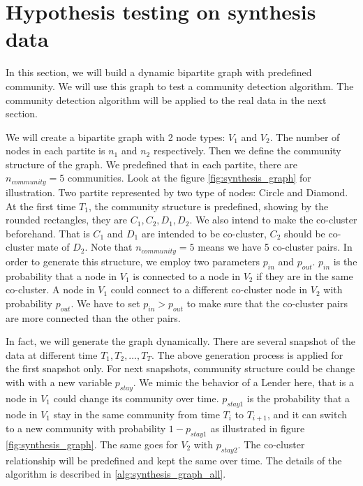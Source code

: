 
\section{Hypothesis testing on synthesis data}

In this section, we will build a dynamic bipartite graph with predefined community.
We will use this graph to test a community detection algorithm.
The community detection algorithm will be applied to the real data in the next section.

We will create a bipartite graph with 2 node types: $V_1$ and $V_2$.
The number of nodes in each partite is $n_1$ and $n_2$ respectively.
Then we define the community structure of the graph.
We predefined that in each partite, there are $n_{community} = 5$ communities.
Look at the figure \ref{fig:synthesis_graph} for illustration.
Two partite represented by two type of nodes: Circle and Diamond.
At the first time $T_1$, the community structure is predefined, showing by the rounded rectangles, they are $C_1, C_2, D_1, D_2$.
We also intend to make the co-cluster beforehand.
That is $C_1$ and $D_1$ are intended to be co-cluster, $C_2$ should be co-cluster mate of $D_2$.
Note that $n_{community} = 5$ means we have 5 co-cluster pairs.
In order to generate this structure, we employ two parameters $p_{in}$ and $p_{out}$.
$p_{in}$ is the probability that a node in $V_1$ is connected to a node in $V_2$ if they are in the same co-cluster.
A node in $V_1$ could connect to a different co-cluster node in $V_2$ with probability $p_{out}$.
We have to set $p_{in} > p_{out}$ to make sure that the co-cluster pairs are more connected than the other pairs.

In fact, we will generate the graph dynamically.
There are several snapshot of the data at different time $T_1, T_2, \ldots, T_T$.
The above generation process is applied for the first snapshot only.
For next snapshots, community structure could be change with with a new variable $p_{stay}$.
We mimic the behavior of a Lender here, that is a node in $V_1$ could change its community over time.
$p_{stay1}$ is the probability that a node in $V_1$ stay in the same community from time $T_i$ to $T_{i+1}$,
and it can switch to a new community with probability $1-p_{stay1}$ as illustrated in figure \ref{fig:synthesis_graph}.
The same goes for $V_2$ with $p_{stay2}$.
The co-cluster relationship will be predefined and kept the same over time.
The details of the algorithm is described in \ref{alg:synthesis_graph_all}.

